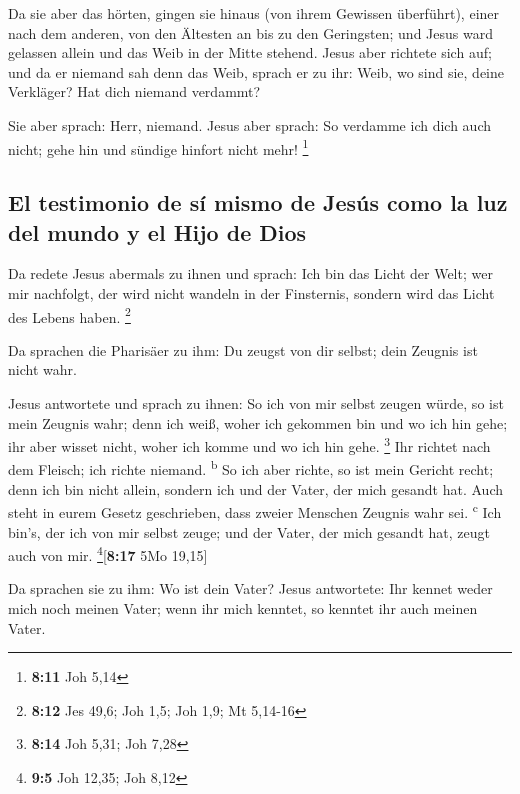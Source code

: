  Da sie aber das hörten, gingen sie hinaus (von ihrem
Gewissen überführt), einer nach dem anderen, von den Ältesten an bis zu
den Geringsten; und Jesus ward gelassen allein und das Weib in der Mitte
stehend.  Jesus aber richtete sich auf; und da er niemand
sah denn das Weib, sprach er zu ihr: Weib, wo sind sie, deine Verkläger?
Hat dich niemand verdammt?

 Sie aber sprach: Herr, niemand. Jesus aber sprach: So
verdamme ich dich auch nicht; gehe hin und sündige hinfort nicht mehr!
\footnote{\textbf{8:11} Joh 5,14}

\hypertarget{el-testimonio-de-suxed-mismo-de-jesuxfas-como-la-luz-del-mundo-y-el-hijo-de-dios}{%
\subsection{El testimonio de sí mismo de Jesús como la luz del mundo y
el Hijo de
Dios}\label{el-testimonio-de-suxed-mismo-de-jesuxfas-como-la-luz-del-mundo-y-el-hijo-de-dios}}

 Da redete Jesus abermals zu ihnen und sprach: Ich bin
das Licht der Welt; wer mir nachfolgt, der wird nicht wandeln in der
Finsternis, sondern wird das Licht des Lebens haben. \footnote{\textbf{8:12}
  Jes 49,6; Joh 1,5; Joh 1,9; Mt 5,14-16}

 Da sprachen die Pharisäer zu ihm: Du zeugst von dir
selbst; dein Zeugnis ist nicht wahr.

 Jesus antwortete und sprach zu ihnen: So ich von mir
selbst zeugen würde, so ist mein Zeugnis wahr; denn ich weiß, woher ich
gekommen bin und wo ich hin gehe; ihr aber wisset nicht, woher ich komme
und wo ich hin gehe. \footnote{\textbf{8:14} Joh 5,31; Joh 7,28}
 Ihr richtet nach dem Fleisch; ich richte niemand.
\textsuperscript{b}  So ich aber richte, so ist mein
Gericht recht; denn ich bin nicht allein, sondern ich und der Vater, der
mich gesandt hat.  Auch steht in eurem Gesetz
geschrieben, dass zweier Menschen Zeugnis wahr sei. \textsuperscript{c}
 Ich bin's, der ich von mir selbst zeuge; und der Vater,
der mich gesandt hat, zeugt auch von mir. \footnote{\textbf{9:5} Joh
  12,35; Joh 8,12}{[}\textbf{8:17} 5Mo 19,15{]}

 Da sprachen sie zu ihm: Wo ist dein Vater? Jesus
antwortete: Ihr kennet weder mich noch meinen Vater; wenn ihr mich
kenntet, so kenntet ihr auch meinen Vater.

